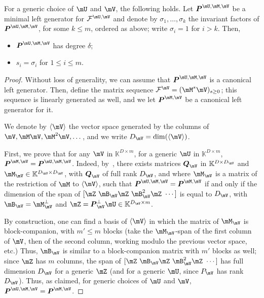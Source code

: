 \documentclass[12pt]{article}
\newcommand{\mat}[1]{\bm{\MakeUppercase{#1}}} %
\newcommand{\seq}{\mathcal{F}} %
\def\K{\mathbb{K}}
\def\K {\ensuremath{\mathbb{K}}}
\begin{document}
\begin{theorem}
  \label{randXY}
  For a generic choice of $\mU$ and $\mV$, the following holds.  Let
  $\mat{P}^{\mU,\mM,\mV}$ be a minimal left generator for
  $\seq^{\mU,\mV}$ and denote by $\sigma_1, \dots, \sigma_k$ the
  invariant factors of $\mat{P}^{\mU,\mM,\mV}$, for some $k \le m$,
  ordered as above; write $\sigma_i=1$ for $i > k$. Then,
  \begin{itemize}
  \item $\mat{P}^{\mU,\mM,\mV}$ has degree $\delta$;
  \item $s_i = \sigma_i$ for $1 \le i \le m$.
  \end{itemize}
\end{theorem}
\begin{proof}
  Without loss of generality, we can assume that
  $\mat{P}^{\mU,\mM,\mV}$ is a canonical left generator. Then, define
  the matrix sequence $\seq^{\mV} = (\mM^s \mV)_{s \ge 0}$; this
  sequence is linearly generated as well, and we let
  $\mat{P}^{\mM,\mV}$ be a canonical left generator for it.

  We denote by $\langle \mV \rangle$ the vector space generated by the
  columns of $\mV,\mM\mV,\mM^2\mV,\dots$, and we write
  $D_\mV=\dim(\langle \mV \rangle)$.
	
  First, we prove that for any $\mV$ in $\K^{D \times m}$, for a
  generic $\mU$ in $\K^{D\times m}$,
  $\mat{P}^{\mM,\mV}=\mat{P}^{\mU,\mM,\mV}$.  Indeed,
  by~\cite[Lemma~4.2]{Villard97a}, there exists matrices $\mat{Q}_\mV$
  in $\K^{D\times D_\mV}$ and $\mM_\mV \in \K^{D_\mV \times D_\mV}$, with
  $\mat{Q}_\mV$ of full rank $D_\mV$, and where $\mM_\mV$ is a matrix of the
  restriction of $\mM$ to $\langle \mV \rangle$, such that
  $\mat{P}^{\mU,\mM,\mV}=\mat{P}^{\mM,\mV}$ if and only if the
  dimension of the span of $[\mZ ~ \mB_\mV \mZ ~\mB_\mV^2 \mZ ~ \cdots]$
  is equal to $D_\mV$, with $\mB_\mV=\mM_\mV^\perp$ and $\mZ=\mat{P}_\mV^\perp
  \mU \in \K^{D_\mV \times m}$.
	
  By construction, one can find a basis of $\langle \mV \rangle$ in
  which the matrix of $\mM_\mV$ is block-companion, with $m' \le m$
  blocks (take the $\mM_\mV$-span of the first column of $\mV$, then of
  the second column, working modulo the previous vector space, etc.)
  Thus, $\mB_\mV$ is similar to a block-companion matrix with $m'$
  blocks as well; since $\mZ$ has $m$ columns, the span of $[\mZ ~
    \mB_\mV \mZ ~\mB_\mV^2 \mZ ~ \cdots]$ has full dimension $D_\mV$ for a
  generic $\mZ$ (and for a generic $\mU$, since $P_\mV$ has rank
  $D_\mV$). Thus, as claimed, for generic choices of $\mU$ and $\mV$,
  $\mat{P}^{\mU,\mM,\mV}=\mat{P}^{\mM,\mV}$.
	

\end{proof}
\end{document}

